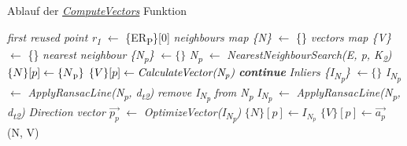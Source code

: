 \begin{algorithm}
	\caption{Ablauf der \textit{\hyperref[alg:compute_vectors]{ComputeVectors}} Funktion}
	\label{alg:compute_vectors}
	\begin{algorithmic}[1]
		\State \textit{first reused point r\textsubscript{1}} $\gets$ \{ER\textsubscript{P}\}[0]
		\State \textit{neighbours map \{N\}} $\gets$ \{\}
		\State \textit{vectors map \{V\}} $\gets$ \{\}
		\State \textit{nearest neighbour \{N\textsubscript{p}\}} $\gets \{\}$
		\State \textit{N\textsubscript{p}} $\gets$ \textit{NearestNeighbourSearch(E, p, K\textsubscript{2})}
		\State $\{N\}[p] \gets \{N\textsubscript{p}\}$
		\State $\{V\}[p] \gets \textit{CalculateVector(N\textsubscript{p})}$
		\State \textit{\textbf{continue}}
		\EndIf
		\State \textit{Inliers \{I\textsubscript{N\textsubscript{p}}\}} $\gets \{\}$
		\State \textit{I\textsubscript{N\textsubscript{p}}} $\gets$ \textit{ApplyRansacLine(N\textsubscript{p}, d\textsubscript{t2})}
		\State \textit{remove I\textsubscript{N\textsubscript{p}} from N\textsubscript{p}}
		\State \textit{I\textsubscript{N\textsubscript{p}}} $\gets$ \textit{ApplyRansacLine(N\textsubscript{p}, d\textsubscript{t2})}
		\EndWhile
		\State \textit{Direction vector $\vec{p_{p}}$} $\gets$ \textit{OptimizeVector(I\textsubscript{N\textsubscript{p}})}
		\State $\{N\}[p] \gets I_{N_p}$
		\State $\{V\}[p] \gets \vec{a_p}$
		\EndFor
		\State \Return (N, V)
		\EndFunction
	\end{algorithmic}
\end{algorithm}


